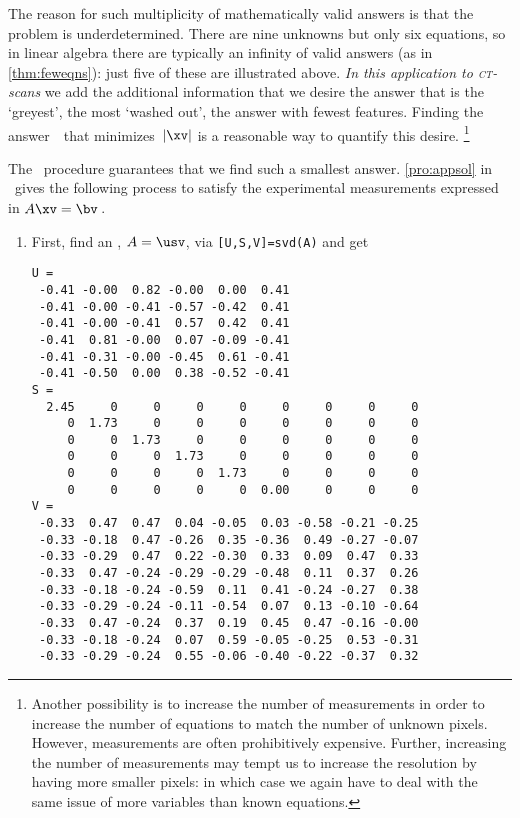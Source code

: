 \begin{example}
The reason for such multiplicity of mathematically valid answers is that the problem is underdetermined.  
There are nine unknowns but only six equations, so in linear algebra there are typically an infinity of valid answers (as in \cref{thm:feweqns}): just five of these are illustrated above.
\emph{In this application to \textsc{ct}-scans} we add the additional information that we desire the answer that is the `greyest', the most `washed out', the answer with fewest features.
Finding the answer~\xv\ that minimizes~\(|\xv|\) is a reasonable way to quantify this desire.%
\footnote{Another possibility is to increase the number of measurements in order to increase the number of equations to match the number of unknown pixels.
However, measurements are often prohibitively expensive.
Further, increasing the number of measurements may tempt us to increase the resolution by having more smaller pixels: in which case we again have to deal with the same issue of more variables than known equations.}

The \svd\ procedure guarantees that we find such a smallest answer.
\cref{pro:appsol} in \script\ gives the following process to satisfy the experimental measurements expressed in \(A\xv=\bv\)\,.
\begin{enumerate}
\item First, find an \svd, \(A=\usv\), via \verb|[U,S,V]=svd(A)| and get \twodp
\setbox\ajrqrbox\hbox{}%
\marginajrbox%
\begin{small}
\begin{verbatim}
U =
 -0.41 -0.00  0.82 -0.00  0.00  0.41
 -0.41 -0.00 -0.41 -0.57 -0.42  0.41
 -0.41 -0.00 -0.41  0.57  0.42  0.41
 -0.41  0.81 -0.00  0.07 -0.09 -0.41
 -0.41 -0.31 -0.00 -0.45  0.61 -0.41
 -0.41 -0.50  0.00  0.38 -0.52 -0.41
S =
  2.45     0     0     0     0     0     0     0     0
     0  1.73     0     0     0     0     0     0     0
     0     0  1.73     0     0     0     0     0     0
     0     0     0  1.73     0     0     0     0     0
     0     0     0     0  1.73     0     0     0     0
     0     0     0     0     0  0.00     0     0     0
V =
 -0.33  0.47  0.47  0.04 -0.05  0.03 -0.58 -0.21 -0.25
 -0.33 -0.18  0.47 -0.26  0.35 -0.36  0.49 -0.27 -0.07
 -0.33 -0.29  0.47  0.22 -0.30  0.33  0.09  0.47  0.33
 -0.33  0.47 -0.24 -0.29 -0.29 -0.48  0.11  0.37  0.26
 -0.33 -0.18 -0.24 -0.59  0.11  0.41 -0.24 -0.27  0.38
 -0.33 -0.29 -0.24 -0.11 -0.54  0.07  0.13 -0.10 -0.64
 -0.33  0.47 -0.24  0.37  0.19  0.45  0.47 -0.16 -0.00
 -0.33 -0.18 -0.24  0.07  0.59 -0.05 -0.25  0.53 -0.31
 -0.33 -0.29 -0.24  0.55 -0.06 -0.40 -0.22 -0.37  0.32
\end{verbatim}
\end{small}



\end{enumerate}
\end{example}
